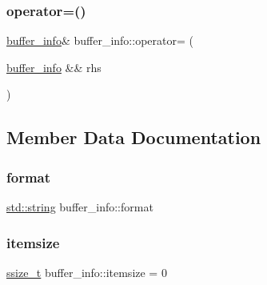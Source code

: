 \mbox{\label{structbuffer__info_a21fc6598b9a1e8df410d1168971a2208}} 
\subsubsection{\texorpdfstring{operator=()}{operator=()}\hspace{0.1cm}{\footnotesize\ttfamily [2/2]}}
{\footnotesize\ttfamily \mbox{\hyperlink{structbuffer__info}{buffer\+\_\+info}}\& buffer\+\_\+info\+::operator= (\begin{DoxyParamCaption}\item[{\mbox{\hyperlink{structbuffer__info}{buffer\+\_\+info}} \&\&}]{rhs }\end{DoxyParamCaption})\hspace{0.3cm}{\ttfamily [inline]}}



\subsection{Member Data Documentation}
\mbox{\label{structbuffer__info_af5d89b84be8905b695a23b914e92bbda}} 
\subsubsection{\texorpdfstring{format}{format}}
{\footnotesize\ttfamily \mbox{\hyperlink{_s_d_l__opengl__glext_8h_ab4ccfaa8ab0e1afaae94dc96ef52dde1}{std\+::string}} buffer\+\_\+info\+::format}

\mbox{\label{structbuffer__info_a8a95447f854c217a3b76168627900139}} 
\subsubsection{\texorpdfstring{itemsize}{itemsize}}
{\footnotesize\ttfamily \mbox{\hyperlink{detail_2common_8h_ac430d16fc097b3bf0a7469cfd09decda}{ssize\+\_\+t}} buffer\+\_\+info\+::itemsize = 0}

\mbox{\label{structbuffer__info_a81d14cf3fc7ceae1b811f335bf35cd97}} 
